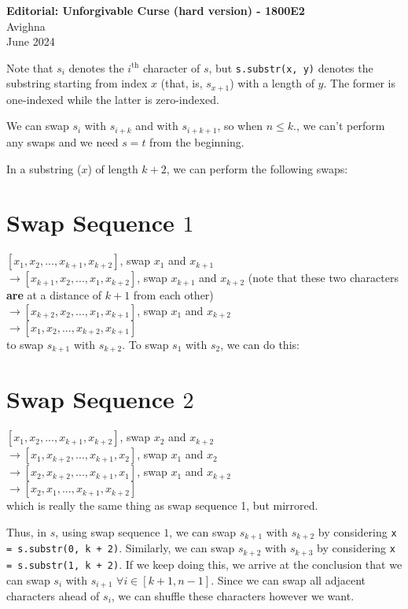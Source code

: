 \documentclass{article}
\begin{document}
\begin{center}
  \large{\textbf{Editorial: Unforgivable Curse (hard version) - 1800E2}}\\
  \vspace{0.2em}
  \large{Avighna}\\
  \vspace{0.2em}
  \large{June 2024}
\end{center}

Note that $s_i$ denotes the $i^{\text{th}}$ character of $s$, but \texttt{s.substr(x, y)} denotes the substring starting from index $x$ (that, is, $s_{x+1}$) with a length of $y$. The former is one-indexed while the latter is zero-indexed.

We can swap $s_i$ with $s_{i+k}$ and with $s_{i+k+1}$, so when $n \le k$., we can't perform any swaps and we need $s=t$ from the beginning.

In a substring ($x$) of length $k+2$, we can perform the following swaps:
\section{Swap Sequence $1$}
$[x_1, x_2, ..., x_{k+1}, x_{k+2}]$, swap $x_1$ and $x_{k+1}$\\
$\rightarrow [x_{k+1}, x_2, ..., x_1, x_{k+2}]$, swap $x_{k+1}$ and $x_{k+2}$ (note that these two characters \textbf{are} at a distance of $k+1$ from each other)\\
$\rightarrow [x_{k+2}, x_2, ..., x_1, x_{k+1}]$, swap $x_1$ and $x_{k+2}$\\
$\rightarrow [x_1, x_2, ..., x_{k+2}, x_{k+1}]$\\

to swap $s_{k+1}$ with $s_{k+2}$. To swap $s_1$ with $s_2$, we can do this:
\section{Swap Sequence $2$}
$[x_1, x_2, ..., x_{k+1}, x_{k+2}]$, swap $x_2$ and $x_{k+2}$\\
$\rightarrow [x_1, x_{k+2}, ..., x_{k+1}, x_2]$, swap $x_1$ and $x_2$\\
$\rightarrow [x_2, x_{k+2}, ..., x_{k+1}, x_1]$, swap $x_1$ and $x_{k+2}$\\
$\rightarrow [x_2, x_1, ..., x_{k+1}, x_{k+2}]$\\

which is really the same thing as swap sequence 1, but mirrored.

Thus, in $s$, using swap sequence $1$, we can swap $s_{k+1}$ with $s_{k+2}$ by considering \texttt{x = s.substr(0, k + 2)}. Similarly, we can swap $s_{k+2}$ with $s_{k+3}$ by considering \texttt{x = s.substr(1, k + 2)}. If we keep doing this, we arrive at the conclusion that we can swap $s_i$ with $s_{i+1}$ $\forall i \in [k+1, n-1]$. Since we can swap all adjacent characters ahead of $s_i$, we can shuffle these characters however we want.
\end{document}
